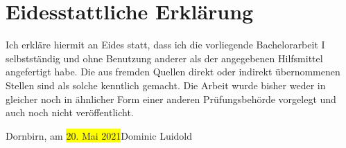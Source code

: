 \documentclass[a4paper,12pt,twoside]{scrreprt}
\begin{document}
\clearpage
{}
{}
\printbibliography

\chapter*{Eidesstattliche Erklärung}
Ich erkläre hiermit an Eides statt, dass ich die vorliegende Bachelorarbeit I selbstständig und ohne Benutzung anderer als der angegebenen Hilfsmittel angefertigt habe. Die aus fremden Quellen direkt oder indirekt übernommenen Stellen sind als solche kenntlich gemacht. Die Arbeit wurde bisher weder in gleicher noch in ähnlicher Form einer anderen Prüfungsbehörde vorgelegt und auch noch nicht veröffentlicht.

\vspace{5cm}
\noindent
Dornbirn, am \colorbox{yellow}{20. Mai 2021}\hfill Dominic Luidold
\end{document}
